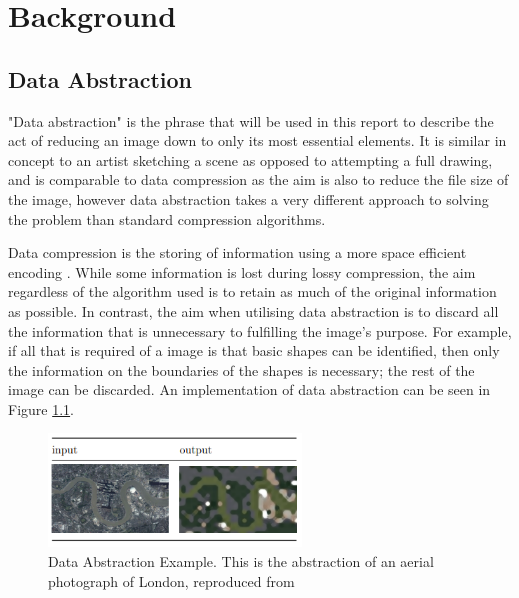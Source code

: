 \chapter{Background}
\section{Data Abstraction}

"Data abstraction" is the phrase that will be used in this report to describe the act of reducing an image down to only its most essential elements. It is similar in concept to an artist sketching a scene as opposed to attempting a full drawing, and is comparable to data compression as the aim is also to reduce the file size of the image, however data abstraction takes a very different approach to solving the problem than standard compression algorithms.

Data compression is the storing of information using a more space efficient encoding \cite{compression}. While some information is lost during lossy compression, the aim regardless of the algorithm used is to retain as much of the original information as possible. In contrast, the aim when utilising data abstraction is to discard all the information that is unnecessary to fulfilling the image's purpose. For example, if all that is required of a image is that basic shapes can be identified, then only the information on the boundaries of the shapes is necessary; the rest of the image can be discarded. An implementation of data abstraction can be seen in Figure \ref{fig:abstraction3rdyear}.


\begin{figure}[H]
    \begin{center}
      \includegraphics[width=0.6\textwidth]{Figures/abstraction3rdyear.png}
      \caption[Data Abstraction Example]{Data Abstraction Example. This is the abstraction of an aerial photograph of London, reproduced from \cite{abstraction3rdyear}}
      \label{fig:abstraction3rdyear}
    \end{center}
\end{figure}

